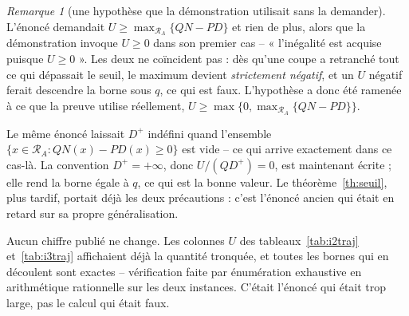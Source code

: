 \documentclass[11pt,a4paper]{article}
\theoremstyle{plain}
\theoremstyle{remark}
\newtheorem{remark}{Remarque}
\newcommand{\Rcal}{\mathcal{R}}
\begin{document}
\begin{remark}[une hypothèse que la démonstration utilisait sans la demander]
\label{rem:uzero}
L'énoncé demandait $U\ge\max_{\Rcal_A}\{QN-PD\}$ et rien de plus, alors que
la démonstration invoque $U\ge 0$ dans son premier cas -- « l'inégalité est
acquise puisque $U\ge 0$ ». Les deux ne coïncident pas : dès qu'une coupe
a retranché tout ce qui dépassait le seuil, le maximum devient
\emph{strictement négatif}, et un $U$ négatif ferait descendre la borne
sous $q$, ce qui est faux. L'hypothèse a donc été ramenée à ce que la
preuve utilise réellement, $U\ge\max\{0,\max_{\Rcal_A}\{QN-PD\}\}$.

Le même énoncé laissait $D^{+}$ indéfini quand l'ensemble
$\{x\in\Rcal_A : QN(x)-PD(x)\ge 0\}$ est vide -- ce qui arrive exactement
dans ce cas-là. La convention $D^{+}=+\infty$, donc $U/(QD^{+})=0$, est
maintenant écrite ; elle rend la borne égale à $q$, ce qui est la bonne
valeur. Le théorème~\ref{th:seuil}, plus tardif, portait déjà les deux
précautions : c'est l'énoncé ancien qui était en retard sur sa propre
généralisation.

Aucun chiffre publié ne change. Les colonnes $U$ des
tableaux~\ref{tab:i2traj} et~\ref{tab:i3traj} affichaient déjà la quantité
tronquée, et toutes les bornes qui en découlent sont exactes -- vérification
faite par énumération exhaustive en arithmétique rationnelle sur les deux
instances. C'était l'énoncé qui était trop large, pas le calcul qui était
faux.
\end{remark}
\end{document}
